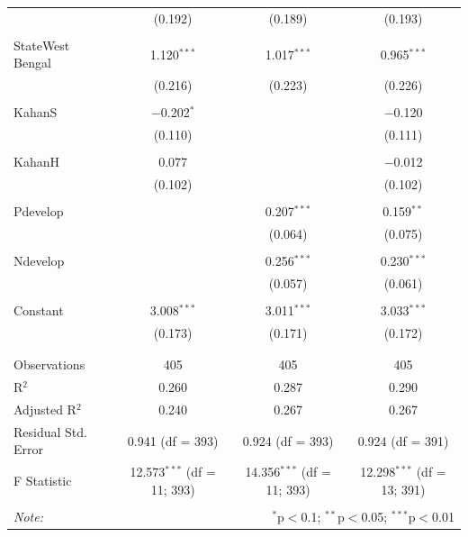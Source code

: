 \documentclass[
]{article}
\begin{document}
\begin{table}[!htbp]
\begin{tabular}{@{\extracolsep{5pt}}lccc}
  & (0.192) & (0.189) & (0.193) \\ 
  & & & \\ 
 StateWest Bengal & 1.120$^{***}$ & 1.017$^{***}$ & 0.965$^{***}$ \\ 
  & (0.216) & (0.223) & (0.226) \\ 
  & & & \\ 
 KahanS & $-$0.202$^{*}$ &  & $-$0.120 \\ 
  & (0.110) &  & (0.111) \\ 
  & & & \\ 
 KahanH & 0.077 &  & $-$0.012 \\ 
  & (0.102) &  & (0.102) \\ 
  & & & \\ 
 Pdevelop &  & 0.207$^{***}$ & 0.159$^{**}$ \\ 
  &  & (0.064) & (0.075) \\ 
  & & & \\ 
 Ndevelop &  & 0.256$^{***}$ & 0.230$^{***}$ \\ 
  &  & (0.057) & (0.061) \\ 
  & & & \\ 
 Constant & 3.008$^{***}$ & 3.011$^{***}$ & 3.033$^{***}$ \\ 
  & (0.173) & (0.171) & (0.172) \\ 
  & & & \\ 
\hline \\[-1.8ex] 
Observations & 405 & 405 & 405 \\ 
R$^{2}$ & 0.260 & 0.287 & 0.290 \\ 
Adjusted R$^{2}$ & 0.240 & 0.267 & 0.267 \\ 
Residual Std. Error & 0.941 (df = 393) & 0.924 (df = 393) & 0.924 (df = 391) \\ 
F Statistic & 12.573$^{***}$ (df = 11; 393) & 14.356$^{***}$ (df = 11; 393) & 12.298$^{***}$ (df = 13; 391) \\ 
\hline 
\hline \\[-1.8ex] 
\textit{Note:}  & \multicolumn{3}{r}{$^{*}$p$<$0.1; $^{**}$p$<$0.05; $^{***}$p$<$0.01} \\ 
\end{tabular} 
\end{table} 
\endgroup

\newpage
\end{document}

